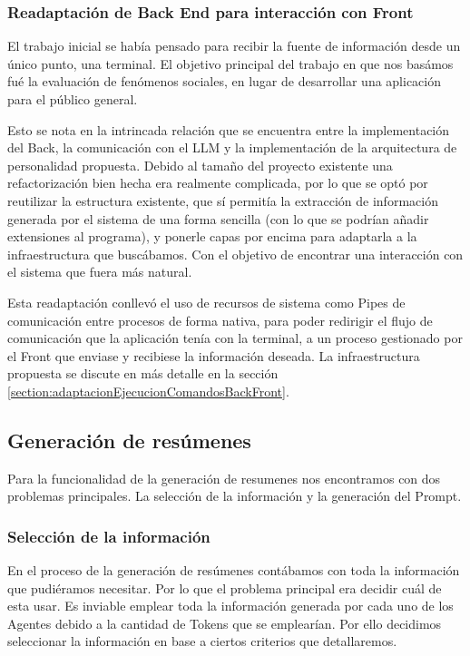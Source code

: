 \subsubsection{Readaptación de Back End para interacción con Front}

El trabajo inicial se había pensado para recibir la fuente de información desde un único punto, una terminal. El objetivo principal del trabajo en que nos basámos fué la evaluación de fenómenos sociales, en lugar de desarrollar una aplicación para el público general.

Esto se nota en la intrincada relación que se encuentra entre la implementación del Back, la comunicación con el LLM y la implementación de la arquitectura de personalidad propuesta. Debido al tamaño del proyecto existente una refactorización bien hecha era realmente complicada, por lo que se optó por reutilizar la estructura existente, que sí permitía la extracción de información generada por el sistema de una forma sencilla (con lo que se podrían añadir extensiones al programa), y ponerle capas por encima para adaptarla a la infraestructura que buscábamos. Con el objetivo de encontrar una interacción con el sistema que fuera más natural.

Esta readaptación conllevó el uso de recursos de sistema como Pipes de comunicación entre procesos de forma nativa, para poder redirigir el flujo de comunicación que la aplicación tenía con la terminal, a un proceso gestionado por el Front que enviase y recibiese la información deseada. La infraestructura propuesta se discute en más detalle en la sección \ref{section:adaptacionEjecucionComandosBackFront}.

\subsection{Generación de resúmenes}

Para la funcionalidad de la generación de resumenes nos encontramos con dos problemas principales. La selección de la información y la generación del Prompt.

\subsubsection{Selección de la información}

En el proceso de la generación de resúmenes contábamos con toda la información que pudiéramos necesitar. Por lo que el problema principal era decidir cuál de esta usar. Es inviable emplear toda la información generada por cada uno de los Agentes debido a la cantidad de Tokens que se emplearían. Por ello decidimos seleccionar la información en base a ciertos criterios que detallaremos.

